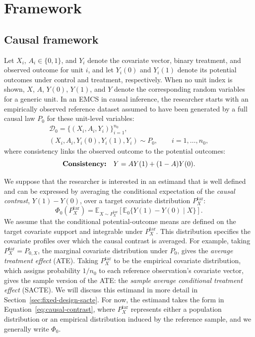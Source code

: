 \section{Framework}
\label{sec:framework}
\subsection{Causal framework}
\label{sec:causal-framework}
Let \(X_i\), \(A_i\in\{0,1\}\), and \(Y_i\) denote the covariate vector, binary treatment, and observed outcome for unit \(i\), and let \(Y_i(0)\) and \(Y_i(1)\) denote its potential outcomes under control and treatment, respectively. When no unit index is shown, \(X\), \(A\), \(Y(0)\), \(Y(1)\), and \(Y\) denote the corresponding random variables for a generic unit. In an EMCS in causal inference, the researcher starts with an empirically observed reference dataset assumed to have been generated by a full causal law \(P_0\) for these unit-level variables:
\begin{equation}
\begin{gathered}
\mathcal D_0=\{(X_i,A_i,Y_i)\}_{i=1}^{n_0},\\
(X_i,A_i,Y_i(0),Y_i(1),Y_i)\sim P_0,\qquad i=1,\dots,n_0,
\end{gathered}
\label{eq:observed-data-causal-law}
\end{equation}
where consistency links the observed outcome to the potential outcomes:
\begin{equation}
\text{\textbf{Consistency:}}\quad Y=AY(1)+(1-A)Y(0).
\label{eq:consistency}
\end{equation}

We suppose that the researcher is interested in an estimand that is well defined and can be expressed by averaging the conditional expectation of the \emph{causal contrast}, \(Y(1)-Y(0)\), over a target covariate distribution \(P_X^{\mathrm{tar}}\):
\begin{equation}
\Phi_0(P_X^{\mathrm{tar}})
=
\mathbb E_{X\sim P_X^{\mathrm{tar}}}
\left[\mathbb E_0\{Y(1)-Y(0)\mid X\}\right].
\label{eq:causal-contrast}
\end{equation}
We assume that the conditional potential-outcome means are defined on the target covariate support and integrable under \(P_X^{\mathrm{tar}}\). This distribution specifies the covariate profiles over which the causal contrast is averaged. For example, taking \(P_X^{\mathrm{tar}}=P_{0,X}\), the marginal covariate distribution under \(P_0\), gives the \emph{average treatment effect} (ATE). Taking \(P_X^{\mathrm{tar}}\) to be the empirical covariate distribution, which assigns probability \(1/n_0\) to each reference observation's covariate vector, gives the sample version of the ATE: the \emph{sample average conditional treatment effect} (SACTE). We will discuss this estimand in more detail in Section~\ref{sec:fixed-design-sacte}. For now, the estimand takes the form in Equation~\eqref{eq:causal-contrast}, where \(P_X^{\mathrm{tar}}\) represents either a population distribution or an empirical distribution induced by the reference sample, and we generally write \(\Phi_0\).

